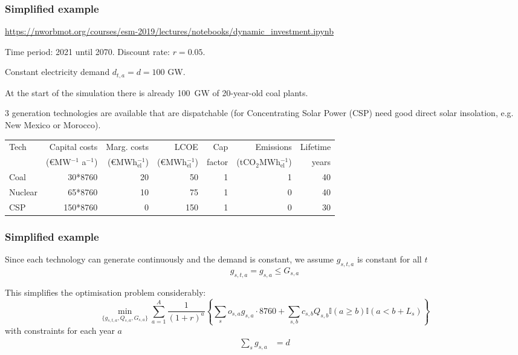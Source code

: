 \documentclass[10pt,aspectratio=169,dvipsnames]{beamer}
\newcommand{\ra}[1]{\renewcommand{\arraystretch}{#1}}
\begin{document}
\begin{frame}
  \frametitle{Simplified example}

  \url{https://nworbmot.org/courses/esm-2019/lectures/notebooks/dynamic_investment.ipynb}

  Time period: 2021 until 2070. Discount rate: $r = 0.05$.

  Constant electricity demand $d_{t,a} = d = 100$ GW.

  At the start of the simulation there is already 100~GW of 20-year-old coal plants.

  3 generation technologies are available that are dispatchable (for Concentrating Solar Power (CSP) need good direct solar insolation, e.g. New Mexico or Morocco).


  \ra{1.1}
  \begin{table}[!t]
    \begin{tabular}{lrrrrrr}
      \toprule
      Tech & Capital costs & Marg. costs & LCOE & Cap & Emissions & Lifetime    \\
       &  (\euro MW$^{-1}$ a$^{-1}$) &  (\euro MWh$_{\textrm{el}}^{-1}$) &  (\euro MWh$_{\textrm{el}}^{-1}$) & factor & (tCO$_2$MWh$_{\textrm{el}}^{-1}$) & years \\
      \midrule
      Coal &30*8760 & 20 & 50 & 1 & 1 & 40\\
      Nuclear & 65*8760 & 10 & 75 & 1 & 0 & 40 \\
      CSP & 150*8760 & 0 & 150 & 1 & 0 & 30 \\
      \bottomrule
    \end{tabular}
  \end{table}



\end{frame}

\begin{frame}
  \frametitle{Simplified example}

  Since each technology can generate continuously and the demand is constant, we assume $g_{s,t,a}$ is constant for all $t$
   \begin{equation*}
    g_{s,t,a} = g_{s,a} \leq G_{s,a}
   \end{equation*}

  This simplifies the optimisation problem considerably:
  \begin{equation*}
              \min_{\{g_{s,t,a},Q_{s,a},G_{s,a}\}} \sum_{a=1}^A \frac{1}{(1+r)^a} \left\{ \sum_{s} o_{s,a} g_{s,a}\cdot 8760 + \sum_{s,b} c_{s,b} Q_{s,b} \mathbb{I}(a  \geq b) \mathbb{I}(a < b+L_s)
 \right\}
  \end{equation*}
  with constraints for each year $a$
  \begin{align*}
    \sum_s g_{s,a} & = d
  \end{align*}
\end{frame}
\end{document}
